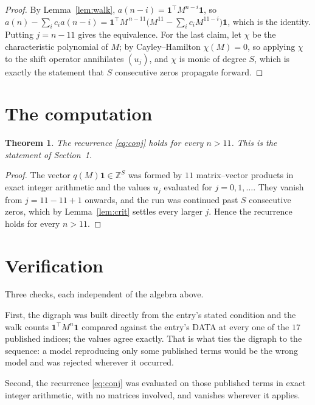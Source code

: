\documentclass[11pt,a4paper]{article}
\theoremstyle{plain}
\newtheorem{theorem}{Theorem}
\theoremstyle{definition}
\begin{document}
\begin{proof}
By Lemma~\ref{lem:walk}, $a(n-i)=\mathbf{1}^{\!\top}M^{n-i}\mathbf{1}$, so
$a(n)-\sum_i c_i a(n-i)
=\mathbf{1}^{\!\top}M^{\,n-11}\bigl(M^{11}-\sum_i c_i M^{11-i}\bigr)
\mathbf{1}$, which is the identity. Putting $j=n-11$ gives the equivalence. For the
last claim, let $\chi$ be the characteristic polynomial of $M$; by Cayley--Hamilton
$\chi(M)=0$, so applying $\chi$ to the shift operator annihilates $(u_j)$, and $\chi$ is
monic of degree $S$, which is exactly the statement that $S$ consecutive zeros propagate
forward.
\end{proof}

\section{The computation}

\begin{theorem}
The recurrence \eqref{eq:conj} holds for every $n>11$. This is the statement of
Section~1.
\end{theorem}

\begin{proof}
The vector $q(M)\mathbf{1}\in\mathbb{Z}^{S}$ was formed by $11$ matrix--vector
products in exact integer arithmetic and the values $u_j$ evaluated for
$j=0,1,\dots$. They vanish from $j=11-11+1$ onwards, and the run was continued past
$S$ consecutive zeros, which by Lemma~\ref{lem:crit} settles every larger $j$. Hence the
recurrence holds for every $n>11$.
\end{proof}

\section{Verification}

Three checks, each independent of the algebra above.

First, the digraph was built directly from the entry's stated condition and the walk counts
$\mathbf{1}^{\!\top}M^{n}\mathbf{1}$ compared against the entry's DATA at every one of
the $17$ published indices; the values agree exactly. That is what ties the digraph to
the sequence: a model reproducing only some published terms would be the wrong model and
was rejected wherever it occurred.

Second, the recurrence \eqref{eq:conj} was evaluated on those published terms in exact
integer arithmetic, with no matrices involved, and vanishes wherever it applies.
\end{document}
